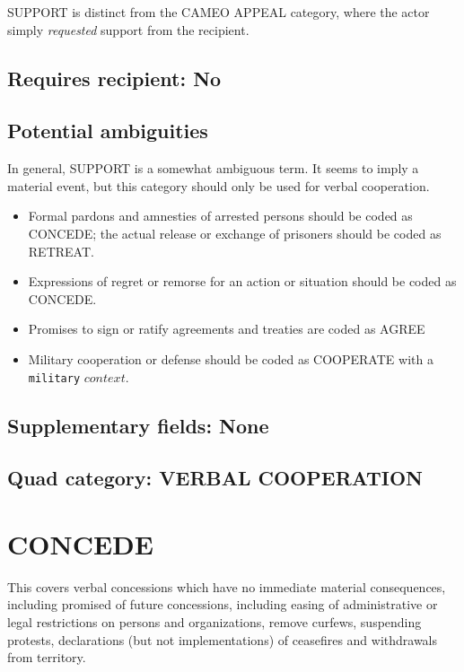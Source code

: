 \documentclass[11pt]{report}
\newcommand{\plcat}[1]{\textsf{#1}}
\newcommand{\txt}[1]{\texttt{#1}}
\begin{document}
\plcat{SUPPORT} is distinct from the CAMEO \plcat{APPEAL} category, where the actor simply \textit{requested} support from the recipient.
 
\subsection{Requires recipient: No}

\subsection{Potential ambiguities}

In general, \plcat{SUPPORT} is a somewhat ambiguous term. It seems to imply a material event, but this category should only be used for verbal cooperation.

\begin{itemize}
\item Formal pardons and amnesties of arrested persons should be coded as \plcat{CONCEDE}; the actual release  or exchange of prisoners should be coded as \plcat{RETREAT}.

\item Expressions of regret or remorse for an action or situation should be coded as \plcat{CONCEDE}.

\item Promises to sign or ratify agreements and treaties are coded as \plcat{AGREE}

\item Military cooperation or defense should be coded as \plcat{COOPERATE} with a \txt{military} $context.$
\end{itemize}

\subsection{Supplementary fields: None}


\subsection{Quad category: VERBAL COOPERATION}


\newpage

\section{CONCEDE}

This covers verbal concessions which have no immediate material consequences, including promised of future concessions, including easing of administrative or legal restrictions on persons and organizations, remove curfews, suspending protests, declarations (but not implementations) of ceasefires and withdrawals from territory.
\end{document}
